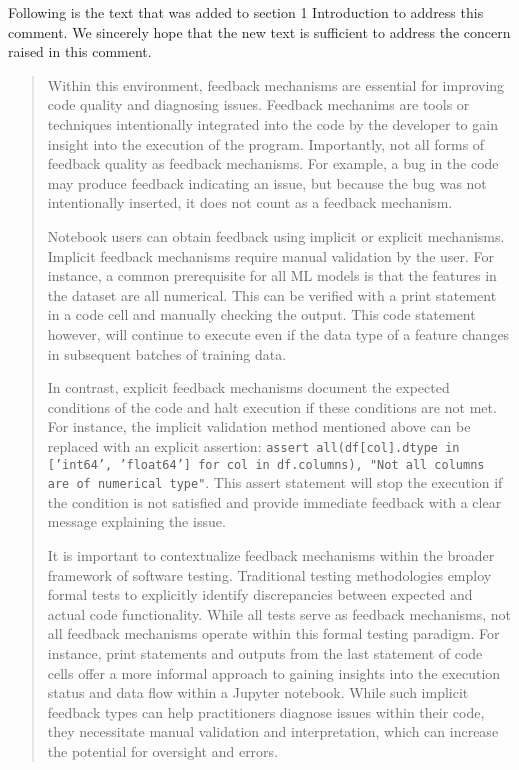 \documentclass[11pt,fleqn]{article}
\begin{document}
Following is the text that was added to section 1 Introduction to address this comment. We sincerely hope that the new text is sufficient to address the concern raised in this comment.

\begin{quote}
  Within this environment, feedback mechanisms are essential for improving code quality and diagnosing issues. Feedback mechanims are tools or techniques intentionally integrated into the code by the developer to gain insight into the execution of the program. Importantly, not all forms of feedback quality as feedback mechanisms. For example, a bug in the code may produce feedback indicating an issue, but because the bug was not intentionally inserted, it does not count as a feedback mechanism.

  Notebook users can obtain feedback using implicit or explicit mechanisms. Implicit feedback mechanisms require manual validation by the user. For instance, a common prerequisite for all ML models is that the features in the dataset are all numerical. This can be verified with a print statement in a code cell and manually checking the output. This code statement however, will continue to execute even if the data type of a feature changes in subsequent batches of training data.

  In contrast, explicit feedback mechanisms document the expected conditions of the code and halt execution if these conditions are not met. For instance, the implicit validation method mentioned above can be replaced with an explicit assertion: \texttt{assert all(df[col].dtype in ['int64', 'float64'] for col in df.columns), "Not all columns are of numerical type"}. This assert statement will stop the execution if the condition is not satisfied and provide immediate feedback with a clear message explaining the issue.

  It is important to contextualize feedback mechanisms within the broader framework of software testing. Traditional testing methodologies employ formal tests to explicitly identify discrepancies between expected and actual code functionality. While all tests serve as feedback mechanisms, not all feedback mechanisms operate within this formal testing paradigm. For instance, print statements and outputs from the last statement of code cells offer a more informal approach to gaining insights into the execution status and data flow within a Jupyter notebook. While such implicit feedback types can help practitioners diagnose issues within their code, they necessitate manual validation and interpretation, which can increase the potential for oversight and errors.
\end{quote}
\end{document}
